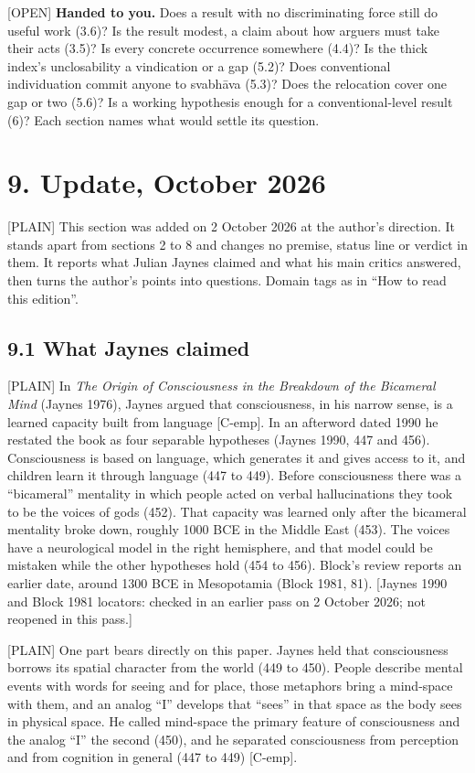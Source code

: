 \documentclass[11pt]{article}
\newcommand{\register}[1]{{\ttfamily\small #1}}
\begin{document}
\register{[OPEN]} \textbf{Handed to you.} Does a result with no discriminating force still do useful work (3.6)? Is the result modest, a claim about how arguers must take their acts (3.5)? Is every concrete occurrence somewhere (4.4)? Is the thick index's unclosability a vindication or a gap (5.2)? Does conventional individuation commit anyone to svabhāva (5.3)? Does the relocation cover one gap or two (5.6)? Is a working hypothesis enough for a conventional-level result (6)? Each section names what would settle its question.

\section*{9. Update, October 2026}

\register{[PLAIN]} This section was added on 2 October 2026 at the author's direction. It stands apart from sections 2 to 8 and changes no premise, status line or verdict in them. It reports what Julian Jaynes claimed and what his main critics answered, then turns the author's points into questions. Domain tags as in ``How to read this edition''.

\subsection*{9.1 What Jaynes claimed}

\register{[PLAIN]} In \emph{The Origin of Consciousness in the Breakdown of the Bicameral Mind} (Jaynes 1976), Jaynes argued that consciousness, in his narrow sense, is a learned capacity built from language [C-emp]. In an afterword dated 1990 he restated the book as four separable hypotheses (Jaynes 1990, 447 and 456). Consciousness is based on language, which generates it and gives access to it, and children learn it through language (447 to 449). Before consciousness there was a ``bicameral'' mentality in which people acted on verbal hallucinations they took to be the voices of gods (452). That capacity was learned only after the bicameral mentality broke down, roughly 1000 BCE in the Middle East (453). The voices have a neurological model in the right hemisphere, and that model could be mistaken while the other hypotheses hold (454 to 456). Block's review reports an earlier date, around 1300 BCE in Mesopotamia (Block 1981, 81). [Jaynes 1990 and Block 1981 locators: checked in an earlier pass on 2 October 2026; not reopened in this pass.]

\register{[PLAIN]} One part bears directly on this paper. Jaynes held that consciousness borrows its spatial character from the world (449 to 450). People describe mental events with words for seeing and for place, those metaphors bring a mind-space with them, and an analog ``I'' develops that ``sees'' in that space as the body sees in physical space. He called mind-space the primary feature of consciousness and the analog ``I'' the second (450), and he separated consciousness from perception and from cognition in general (447 to 449) [C-emp].
\end{document}
